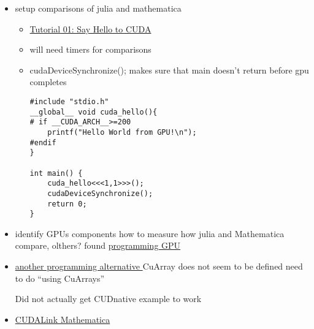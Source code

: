 \documentclass[hyperref,idxtotoc]{labbook}
\begin{document}
\begin{itemize}
\item setup comparisons of julia and mathematica
  \begin{itemize}
  \item \href{https://cuda-tutorial.readthedocs.io/en/latest/tutorials/tutorial01/}{Tutorial 01: Say Hello to CUDA}

  \item will need timers for comparisons

    
\item    cudaDeviceSynchronize(); makes sure that main doesn't return before gpu completes


    
\begin{verbatim}
#include "stdio.h"
__global__ void cuda_hello(){
# if __CUDA_ARCH__>=200
    printf("Hello World from GPU!\n");
#endif  
}

int main() {
    cuda_hello<<<1,1>>>();
    cudaDeviceSynchronize();
    return 0;
}

\end{verbatim}
  \end{itemize}

\item identify GPUs components how to measure how julia and Mathematica compare, olthers?
found \href{https://nextjournal.com/sdanisch/julia-gpu-programming#writing-gpu-kernels}{programming GPU}
\item \href{https://juliagpu.github.io/CUDAnative.jl/stable/man/usage.html}{another programming alternative }
  CuArray does not seem to be defined need to do ``using CuArrays''

  Did not actually get CUDnative example to work
\item \href{https://reference.wolfram.com/cloudplatform/CUDALink/tutorial/Overview.html}{CUDALink Mathematica}
\end{itemize}




\printindex
\end{document}
